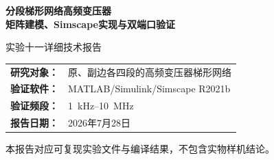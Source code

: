 \documentclass[UTF8,12pt,a4paper]{ctexart}
\begin{document}
\begin{titlepage}
\centering
\vspace*{2.0cm}
{\Huge\bfseries\color{navy} 分段梯形网络高频变压器\\[0.35em]
矩阵建模、Simscape实现与双端口验证\par}
\vspace{1.2cm}
{\Large 实验十一详细技术报告\par}
\vspace{1.5cm}
\vfill
\begin{tabular}{rl}
\textbf{研究对象：} & 原、副边各四段的高频变压器梯形网络\\
\textbf{验证软件：} & MATLAB/Simulink/Simscape R2021b\\
\textbf{验证频段：} & \SI{1}{kHz}--\SI{10}{MHz}\\
\textbf{报告日期：} & 2026年7月28日
\end{tabular}
\vfill
{\large 本报告对应可复现实验文件与编译结果，不包含实物样机结论。}
\end{titlepage}

\begin{abstract}
本实验把传统连续式绕组梯形等效网络的“分段、组装、端口消元”思想迁移到高频变压器，建立了原、副边各四段、包含全耦合电感矩阵、纵向电容、节点对地电容以及逐段绕组间电容的宽频小信号模型。首先从支路--节点关联矩阵出发推导完整节点导纳矩阵，并通过Kron消元得到DAB可观测的二端口导纳矩阵。随后在Simscape中用自定义八绕组耦合元件和显式电压测试端口建立独立物理网络，对模型进行线性化，获得82阶状态空间模型。最终在161个对数频点上比较Simscape线性化结果与矩阵参考解。

验证结果表明，\SI{1}{kHz}--\SI{10}{MHz}范围内二者平均Frobenius相对误差为
\(2.016\times10^{-9}\)，最大误差为\(2.009\times10^{-8}\)；Simscape结果的最大互易性残差为
\(4.657\times10^{-10}\,\mathrm{S}\)。这证明当前拓扑组装、参数映射、端口定义和线性化链路在数值层面一致。需要强调的是，本结果属于“独立求解器、相同参数与相同模型结构”的实现验证，尚不能替代高频变压器样机、有限元或DAB开关运行验证。
\end{abstract}
\end{document}
